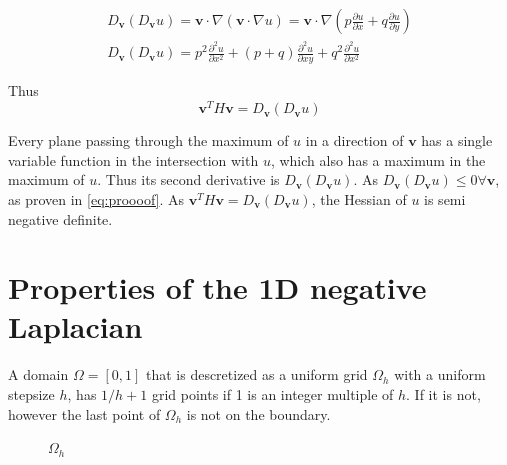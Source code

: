 \documentclass{article}
\begin{document}
\begin{align*}
D_{\mathbf{v}}\left(D_{\mathbf{v}} u\right)=\mathbf{v}\cdot \nabla(\mathbf{v} \cdot \nabla u)=\mathbf{v}\cdot \nabla(p\frac{\partial u}{\partial x}+q\frac{\partial u}{\partial y})\\
D_{\mathbf{v}}\left(D_{\mathbf{v}} u\right)=p^2\frac{\partial^2 u}{\partial x^2}+(p+q)\frac{\partial^2 u}{\partial xy} +q^2\frac{\partial^2 u}{\partial x^2}
\end{align*}

Thus 
\begin{equation}
\mathbf{v}^{T} H \mathbf{v}=D_{\mathbf{v}}\left(D_{\mathbf{v}} u\right)
\end{equation}


Every plane passing through the maximum of $u$ in a direction of $\mathbf{v}$ has a single variable function in the intersection with $u$, which also has a maximum in the maximum of $u$. Thus its second derivative is $D_{\mathbf{v}}\left(D_{\mathbf{v}} u\right)$.
As $D_{\mathbf{v}}\left(D_{\mathbf{v}} u\right) \leq 0   \forall \mathbf{v}$, as proven in \autoref{eq:proooof}. As $\mathbf{v}^{T} H \mathbf{v}=D_{\mathbf{v}}\left(D_{\mathbf{v}} u\right)$, the Hessian of $u$ is semi negative definite.


\newpage
\section{Properties of the 1D negative Laplacian}
A domain $\Omega=\left[0,1\right]$ that is descretized as a uniform grid $\Omega_h$ with a uniform stepsize $h$, has $1/h+1$ grid points if 1 is an integer multiple of $h$. If it is not, however the last point of $\Omega_h$ is not on the boundary.
\begin{figure}[H]
\centering
{}
\caption{$\Omega_h$}
\end{figure}
\end{document}
